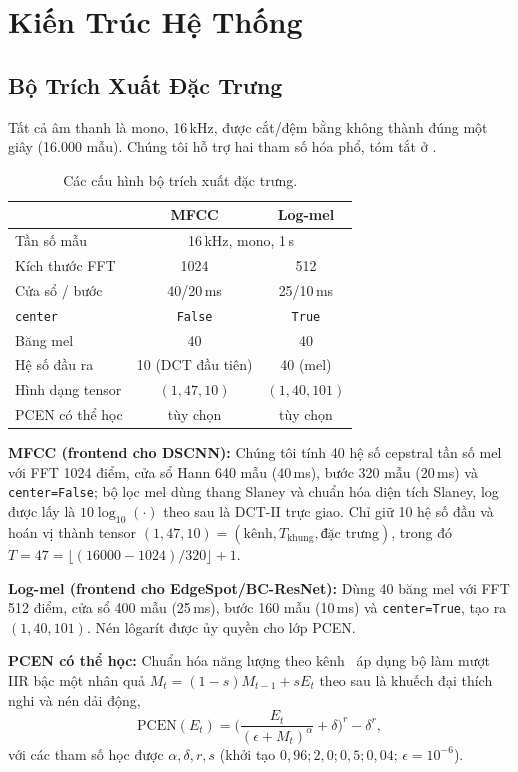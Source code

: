 \documentclass[12pt,a4paper]{report}
\newcommand{\code}[1]{\texttt{\small #1}}
\begin{document}
\section{Kiến Trúc Hệ Thống}\label{sec:arch}

\subsection{Bộ Trích Xuất Đặc Trưng}\label{sec:frontends}

Tất cả âm thanh là mono, 16\,kHz, được cắt/đệm bằng không thành đúng một giây
(16.000 mẫu). Chúng tôi hỗ trợ hai tham số hóa phổ, tóm tắt ở .

\begin{table}[t]
\centering
\caption{Các cấu hình bộ trích xuất đặc trưng.}
\label{tab:features}
\begin{tabular}{lcc}
\toprule
 & \textbf{MFCC} & \textbf{Log-mel} \\
\midrule
Tần số mẫu    & \multicolumn{2}{c}{16\,kHz, mono, 1\,s} \\
Kích thước FFT & 1024  & 512  \\
Cửa sổ / bước  & 40/20\,ms & 25/10\,ms \\
\code{center}  & \code{False} & \code{True} \\
Băng mel       & 40 & 40 \\
Hệ số đầu ra   & 10 (DCT đầu tiên) & 40 (mel) \\
Hình dạng tensor & $(1,47,10)$ & $(1,40,101)$ \\
PCEN có thể học & tùy chọn & tùy chọn \\
\bottomrule
\end{tabular}
\end{table}

\textbf{MFCC (frontend cho DSCNN):} Chúng tôi tính 40 hệ số cepstral tần số mel
với FFT 1024 điểm, cửa sổ Hann 640 mẫu (40\,ms), bước 320 mẫu (20\,ms) và
\code{center=False}; bộ lọc mel dùng thang Slaney và chuẩn hóa diện tích Slaney,
log được lấy là $10\log_{10}(\cdot)$ theo sau là DCT-II trực giao. Chỉ giữ 10 hệ
số đầu và hoán vị thành tensor $(1,47,10)=(\text{kênh}, T_{\text{khung}},
\text{đặc trưng})$, trong đó $T = 47 = \lfloor(16000-1024)/320\rfloor + 1$.

\textbf{Log-mel (frontend cho EdgeSpot/BC-ResNet):} Dùng 40 băng mel với FFT 512
điểm, cửa sổ 400 mẫu (25\,ms), bước 160 mẫu (10\,ms) và \code{center=True}, tạo
ra $(1,40,101)$. Nén lôgarít được ủy quyền cho lớp PCEN.

\textbf{PCEN có thể học:} Chuẩn hóa năng lượng theo kênh~\cite{wang2017trainable}
áp dụng bộ làm mượt IIR bậc một nhân quả $M_t = (1-s)M_{t-1} + sE_t$ theo sau là
khuếch đại thích nghi và nén dải động,
\begin{equation}
\text{PCEN}(E_t)=\Big(\frac{E_t}{(\epsilon+M_t)^{\alpha}}+\delta\Big)^{r}-\delta^{r},
\label{eq:pcen}
\end{equation}
với các tham số học được $\alpha,\delta,r,s$ (khởi tạo $0{,}96; 2{,}0; 0{,}5;
0{,}04$; $\epsilon{=}10^{-6}$).
\end{document}

